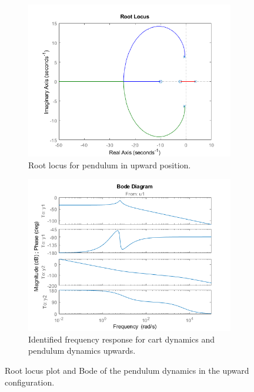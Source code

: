 \documentclass[12pt]{article}
\begin{document}
\begin{figure}[H]
    \centering
    \begin{subfigure}[b]{0.45\textwidth}
        \includegraphics[width=\textwidth]{../plots/rlocus_up.png}
        \caption{Root locus for pendulum in upward position.}
        \label{fig:rl_up}
    \end{subfigure}
    \hfill
    \begin{subfigure}[b]{0.45\textwidth}
        \includegraphics[width=\textwidth]{../plots/bode_up.png}
        \caption{Identified frequency response for cart dynamics and pendulum dynamics upwards.}
        \label{fig:bode_up}
    \end{subfigure}
    \caption{Root locus plot and Bode of the pendulum dynamics in the upward configuration.}
    \label{fig:bode_plots}
\end{figure}
\end{document}
